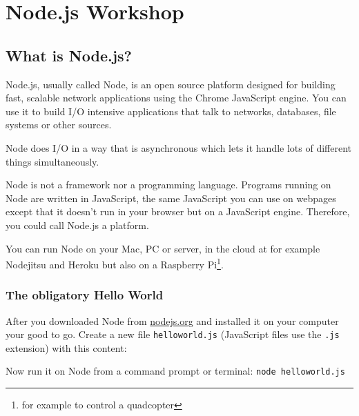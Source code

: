 \documentclass[a4paper]{report}
\begin{document}
\chapter*{\textcolor{seccol}{Node.js} Workshop}

\section*{What is Node.js?}
Node.js, usually called Node, is an open source platform designed for building fast, scalable network applications using the Chrome JavaScript engine. You can use it to build I/O intensive applications that talk to networks, databases, file systems or other sources.

Node does I/O in a way that is asynchronous which lets it handle lots of different things simultaneously.

Node is not a framework nor a programming language. Programs running on Node are written in JavaScript, the same JavaScript you can use on webpages except that it doesn't run in your browser but on a JavaScript engine. Therefore, you could call Node.js a platform.

You can run Node on your Mac, PC or server, in the cloud at for example Nodejitsu and Heroku but also on a Raspberry Pi\footnote{for example to control a quadcopter}. 

\subsection*{The obligatory Hello World}

After you downloaded Node from \href{http://nodejs.org}{nodejs.org} and installed it on your computer your good to go. Create a new file \texttt{helloworld.js} (JavaScript files use the \texttt{.js} extension) with this content:



\noindent Now run it on Node from a command prompt or terminal: \colorbox{codecol}{\lstinline[language=bash]{node helloworld.js}}
\end{document}
